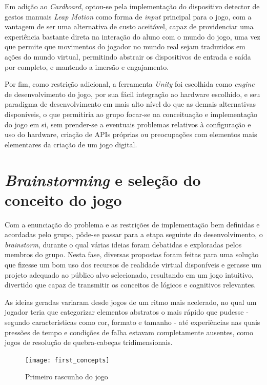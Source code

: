 Em adição ao \textit{Cardboard}, optou-se pela implementação do dispositivo detector de gestos manuais \textit{Leap Motion} como forma de \textit{input} principal para o jogo, com a vantagem de ser uma alternativa de custo aceitável, capaz de providenciar uma experiência bastante direta na interação do aluno com o mundo do jogo, uma vez que permite que movimentos do jogador no mundo real sejam traduzidos em ações do mundo virtual, permitindo abstrair os dispositivos de entrada e saída por completo, e mantendo a imersão e engajamento.

Por fim, como restrição adicional, a ferramenta \textit{Unity} foi escolhida como \textit{engine} de desenvolvimento do jogo, por sua fácil integração ao hardware escolhido, e seu paradigma de desenvolvimento em mais alto nível do que as demais alternativas disponíveis, o que permitiria ao grupo focar-se na conceituação e implementação do jogo em si, sem prender-se a eventuais problemas relativos à configuração e uso do hardware, criação de APIs próprias ou preocupações com elementos mais elementares da criação de um jogo digital.

\section{\textit{Brainstorming} e seleção do conceito do jogo}\label{sec-brainstorming-conceito}

Com a enunciação do problema e as restrições de implementação bem definidas e acordadas pelo grupo, pôde-se passar para a etapa seguinte do desenvolvimento, o \textit{brainstorm}, durante o qual várias ideias foram debatidas e exploradas pelos membros do grupo. Nesta fase, diversas propostas foram feitas para uma solução que fizesse um bom uso dos recursos de realidade virtual disponíveis e gerasse um projeto adequado ao público alvo selecionado, resultando em um jogo intuitivo, divertido que capaz de transmitir os conceitos de lógicos e cognitivos relevantes.

As ideias geradas variaram desde jogos de um ritmo mais acelerado, no qual um jogador teria que categorizar elementos abstratos o mais rápido que pudesse - segundo características como cor, formato e tamanho - até experiências nas quais pressões de tempo e condições de falha estavam completamente ausentes, como jogos de resolução de quebra-cabeças tridimensionais.

\begin{figure}[h]
	\centering
	\texttt{[image: first\_concepts]}
	\caption{Primeiro rascunho do jogo}
\end{figure}


